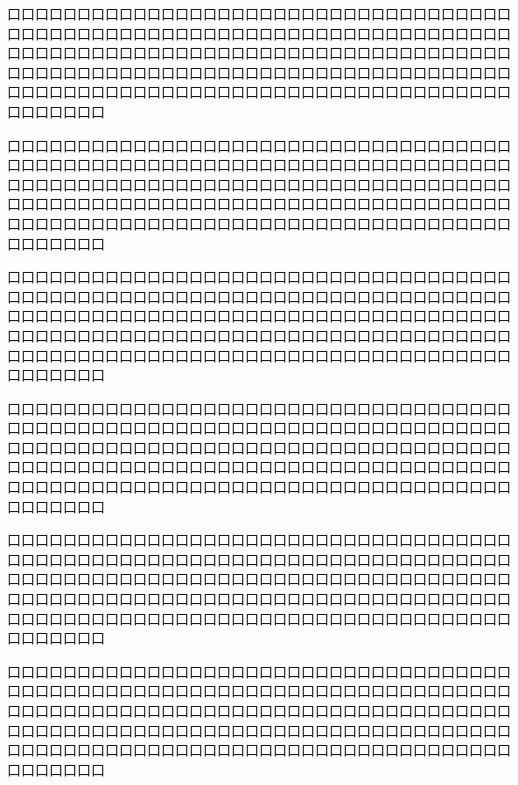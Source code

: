 口口口口口口口口口口口口口口口口口口口口口口口口口口口口口口口口口口口口口口口口口口口口口口口口口口口口口口口口口口口口口口口口口口口口口口口口口口口口口口口口口口口口口口口口口口口口口口口口口口口口口口口口口口口口口口口口口口口口口口口口口口口口口口口口口口口口口口口口口口口口口口口口口口口口口口口口口口口口口口口口口口口口口口口口口口口口口口口口口口口口口口口口口口口

口口口口口口口口口口口口口口口口口口口口口口口口口口口口口口口口口口口口口口口口口口口口口口口口口口口口口口口口口口口口口口口口口口口口口口口口口口口口口口口口口口口口口口口口口口口口口口口口口口口口口口口口口口口口口口口口口口口口口口口口口口口口口口口口口口口口口口口口口口口口口口口口口口口口口口口口口口口口口口口口口口口口口口口口口口口口口口口口口口口口口口口口口口口

口口口口口口口口口口口口口口口口口口口口口口口口口口口口口口口口口口口口口口口口口口口口口口口口口口口口口口口口口口口口口口口口口口口口口口口口口口口口口口口口口口口口口口口口口口口口口口口口口口口口口口口口口口口口口口口口口口口口口口口口口口口口口口口口口口口口口口口口口口口口口口口口口口口口口口口口口口口口口口口口口口口口口口口口口口口口口口口口口口口口口口口口口口口


口口口口口口口口口口口口口口口口口口口口口口口口口口口口口口口口口口口口口口口口口口口口口口口口口口口口口口口口口口口口口口口口口口口口口口口口口口口口口口口口口口口口口口口口口口口口口口口口口口口口口口口口口口口口口口口口口口口口口口口口口口口口口口口口口口口口口口口口口口口口口口口口口口口口口口口口口口口口口口口口口口口口口口口口口口口口口口口口口口口口口口口口口口口


口口口口口口口口口口口口口口口口口口口口口口口口口口口口口口口口口口口口口口口口口口口口口口口口口口口口口口口口口口口口口口口口口口口口口口口口口口口口口口口口口口口口口口口口口口口口口口口口口口口口口口口口口口口口口口口口口口口口口口口口口口口口口口口口口口口口口口口口口口口口口口口口口口口口口口口口口口口口口口口口口口口口口口口口口口口口口口口口口口口口口口口口口口口


口口口口口口口口口口口口口口口口口口口口口口口口口口口口口口口口口口口口口口口口口口口口口口口口口口口口口口口口口口口口口口口口口口口口口口口口口口口口口口口口口口口口口口口口口口口口口口口口口口口口口口口口口口口口口口口口口口口口口口口口口口口口口口口口口口口口口口口口口口口口口口口口口口口口口口口口口口口口口口口口口口口口口口口口口口口口口口口口口口口口口口口口口口口